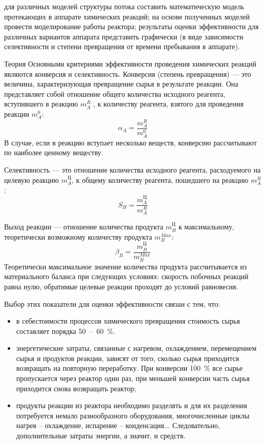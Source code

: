 
\goal для различных моделей структуры потока составить математическую модель протекающих в аппарате химических реакций; на основе полученных моделей провести моделирование работы реактора; результаты оценки эффективности для различных вариантов аппарата представить графически (в виде зависимости селективности и степени превращения от времени пребывания в аппарате).

Теория
Основными критериями эффективности проведения химических реакций являются конверсия и селективность. 
Конверсия (степень превращения) --- это величина, характеризующая превращение сырья в результате реакции. Она представляет собой отношение общего количества исходного реагента, вступившего в реакцию $m_A^R$ , к количеству реагента, взятого для проведения реакции $m_A^0$:
\begin{equation}\label{eq:rea.alpha}
	\alpha_A = \dfrac{m_A^R}{m_A^0}
\end{equation}
В случае, если в реакцию вступает несколько веществ, конверсию рассчитывают по наиболее ценному веществу.  

Селективность --- это отношение количества исходного реагента, расходуемого на целевую реакцию $m_A^Ц$, к общему количеству реагента, пошедшего на реакцию $m_A^R$:
\begin{equation}\label{eq:rea.s}
	S_B= \dfrac{m_A^Ц}{m_A^R}
\end{equation}

Выход реакции --- отношение количества продукта $m_B^Ц$ к максимальному, теоретически возможному количеству продукта $m_B^{Max}$:
\begin{equation}\label{eq:rea.beta}
	\beta_B=\dfrac{m_B^Ц}{m_B^{Max}}
\end{equation}
Теоретически максимальное значение количества продукта рассчитывается из материального баланса при следующих условиях: скорость побочных реакций равна нулю, обратимые целевые реакции проходят до условий равновесия.

Выбор этих показатели для оценки эффективности связан с тем, что:
\begin{itemize}
	\item в себестоимости процессов химического превращения стоимость сырья составляет порядка 50\ --\ 60\ \%.
	\item энергетические затраты, связанные с нагревом, охлаждением, перемещением сырья и продуктов реакции, зависят от того, сколько сырья приходится возвращать на повторную переработку. При конверсии 100\ \% все сырье пропускается через реактор один раз, при меньшей конверсии часть сырья приходится снова возвращать реактор;
	\item продукты реакции из реактора необходимо разделять и для их разделения потребуется немало разнообразного оборудования, многочисленные циклы нагрев -- охлаждение, испарение -- конденсация... Следовательно, дополнительные затраты энергии, а значит, и средств.
\end{itemize}

